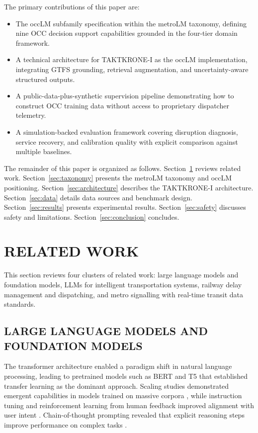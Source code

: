 \documentclass{IEEEoj}
\begin{document}
The primary contributions of this paper are:
\begin{itemize}
    \item The occLM subfamily specification within the metroLM taxonomy, defining nine OCC decision support capabilities grounded in the four-tier domain framework.
    \item A technical architecture for TAKTKRONE-I as the occLM implementation, integrating GTFS grounding, retrieval augmentation, and uncertainty-aware structured outputs.
    \item A public-data-plus-synthetic supervision pipeline demonstrating how to construct OCC training data without access to proprietary dispatcher telemetry.
    \item A simulation-backed evaluation framework covering disruption diagnosis, service recovery, and calibration quality with explicit comparison against multiple baselines.
\end{itemize}

The remainder of this paper is organized as follows. Section~\ref{sec:related} reviews related work. Section~\ref{sec:taxonomy} presents the metroLM taxonomy and occLM positioning. Section~\ref{sec:architecture} describes the TAKTKRONE-I architecture. Section~\ref{sec:data} details data sources and benchmark design. Section~\ref{sec:results} presents experimental results. Section~\ref{sec:safety} discusses safety and limitations. Section~\ref{sec:conclusion} concludes.

\section{RELATED WORK}
\label{sec:related}

This section reviews four clusters of related work: large language models and foundation models, LLMs for intelligent transportation systems, railway delay management and dispatching, and metro signalling with real-time transit data standards.

\subsection{LARGE LANGUAGE MODELS AND FOUNDATION MODELS}

The transformer architecture \cite{vaswani2017attention} enabled a paradigm shift in natural language processing, leading to pretrained models such as BERT \cite{devlin2019bert} and T5 \cite{raffel2020exploring} that established transfer learning as the dominant approach. Scaling studies demonstrated emergent capabilities in models trained on massive corpora \cite{brown2020language}, while instruction tuning and reinforcement learning from human feedback improved alignment with user intent \cite{ouyang2022training}. Chain-of-thought prompting revealed that explicit reasoning steps improve performance on complex tasks \cite{wei2022chain}.
\end{document}
